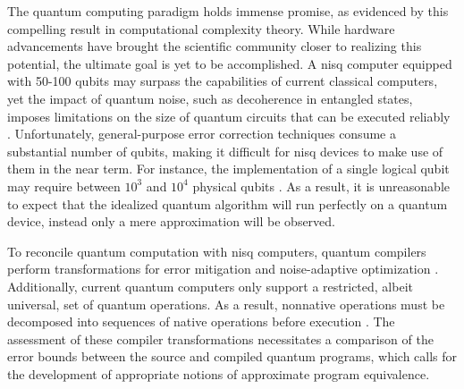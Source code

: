 

The quantum computing paradigm holds immense promise, as evidenced by this compelling result in computational complexity theory.  While hardware advancements have brought the scientific community closer to realizing this potential, the ultimate goal is yet to be accomplished. A \acrfull{nisq} computer equipped with 50-100 qubits may surpass the capabilities of current classical computers, yet the impact of quantum noise, such as decoherence in entangled states, imposes limitations on the size of quantum circuits that can be executed reliably \cite{preskill2018quantum}. Unfortunately, general-purpose error correction techniques \cite{calderbank1996good, gottesman1997stabilizer, steane1996error} consume a substantial number of qubits, making it difficult for \acrshort{nisq} devices to make use of them in the near term. For instance, the implementation of a single logical qubit may require between $10^3$ and $10^4$ physical qubits \cite{fowler2012surface}. As a result, it is unreasonable to expect that the idealized quantum algorithm will run perfectly on a quantum device, instead
only a mere approximation will be observed.

To reconcile quantum computation with \acrshort{nisq} computers, quantum compilers perform transformations for error mitigation \cite{wallman2016noise} and noise-adaptive optimization \cite{murali2019noise}. Additionally, current quantum computers only support a restricted, albeit universal, set of quantum operations. As a result, nonnative operations must be decomposed into sequences of native operations before execution \cite{harrow2002efficient,burgholzer2020advanced}. The assessment of these compiler transformations necessitates a comparison of the error bounds between the source and compiled quantum programs, which calls  for the development of appropriate notions of approximate program equivalence.


